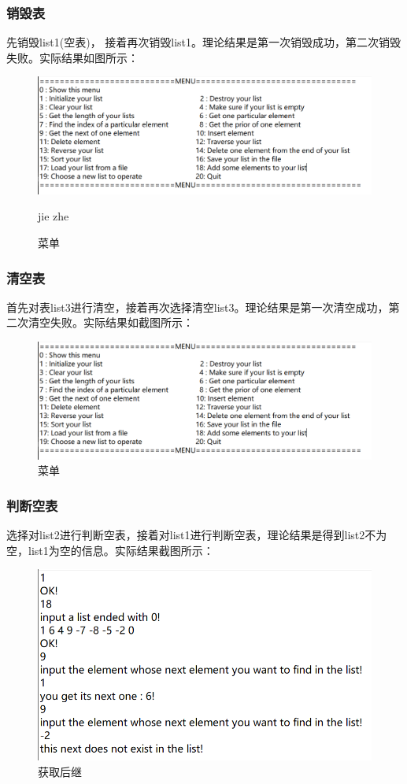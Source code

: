 \documentclass[supercite]{Experimental_Report}
\theoremstyle{definition}
\begin{document}
\subsubsection{销毁表}
先销毁list1(空表)， 接着再次销毁list1。理论结果是第一次销毁成功，第二次销毁失败。实际结果如图所示：
\begin{figure}[htbp]
	\centering
	\includegraphics[scale = 0.7]{images/1.png}
	\caption{菜单}jie zhe
\end{figure}

\subsubsection{清空表}
首先对表list3进行清空，接着再次选择清空list3。理论结果是第一次清空成功，第二次清空失败。实际结果如截图所示：
\begin{figure}[htbp]
	\centering
	\includegraphics[scale = 0.7]{images/1.png}
	\caption{菜单}
\end{figure}
\subsubsection{判断空表}
选择对list2进行判断空表，接着对list1进行判断空表，理论结果是得到list2不为空，list1为空的信息。实际结果截图所示：
\begin{figure}[htbp]
	\centering
	\includegraphics[scale = 0.7]{images/8.png}
	\caption{获取后继}
\end{figure}
\end{document}
